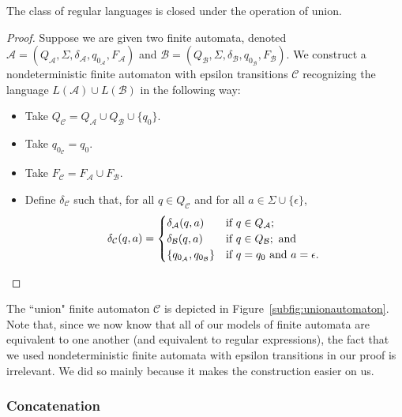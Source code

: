 \begin{theorem}\label{thm:FAclosureunion}
The class of regular languages is closed under the operation of union.

\begin{proof}
Suppose we are given two finite automata, denoted $\mathcal{A} = (Q_{\mathcal{A}}, \Sigma, \allowbreak \delta_{\mathcal{A}}, q_{0_{\mathcal{A}}}, F_{\mathcal{A}})$ and $\mathcal{B} = (Q_{\mathcal{B}}, \Sigma, \delta_{\mathcal{B}}, q_{0_{\mathcal{B}}}, F_{\mathcal{B}})$. We construct a nondeterministic finite automaton with epsilon transitions $\mathcal{C}$ recognizing the language $L(\mathcal{A}) \cup L(\mathcal{B})$ in the following way:
\begin{itemize}
\item Take $Q_{\mathcal{C}} = Q_{\mathcal{A}} \cup Q_{\mathcal{B}} \cup \{q_{0}\}$.
\item Take $q_{0_{\mathcal{C}}} = q_{0}$.
\item Take $F_{\mathcal{C}} = F_{\mathcal{A}} \cup F_{\mathcal{B}}$.
\item Define $\delta_{\mathcal{C}}$ such that, for all $q \in Q_{\mathcal{C}}$ and for all $a \in \Sigma \cup \{\epsilon\}$,
\begin{equation*}
\delta_{\mathcal{C}}(q, a) = 
\begin{cases}
\delta_{\mathcal{A}}(q, a)					& \text{if } q \in Q_{\mathcal{A}}; \\
\delta_{\mathcal{B}}(q, a)					& \text{if } q \in Q_{\mathcal{B}}; \text{ and} \\
\{q_{0_{\mathcal{A}}}, q_{0_{\mathcal{B}}}\}	& \text{if } q = q_{0} \text{ and } a = \epsilon.
\end{cases}
\qedhere
\end{equation*}
\end{itemize}
\end{proof}
\end{theorem}

The ``union" finite automaton $\mathcal{C}$ is depicted in Figure~\ref{subfig:unionautomaton}. Note that, since we now know that all of our models of finite automata are equivalent to one another (and equivalent to regular expressions), the fact that we used nondeterministic finite automata with epsilon transitions in our proof is irrelevant. We did so mainly because it makes the construction easier on us.

\subsubsection*{Concatenation}

